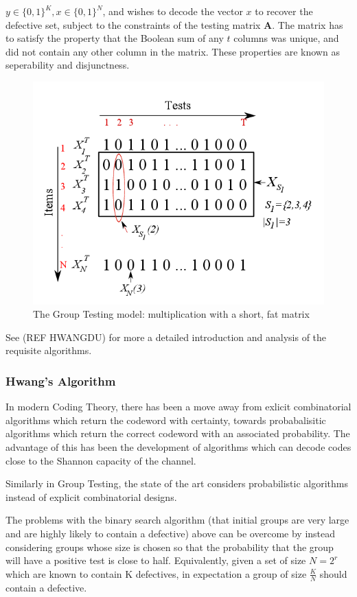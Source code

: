 \(y \in \{0,1\}^K, x \in \{0,1\}^N\), and wishes to decode the vector \(x\) to recover the defective set, subject to the constraints of the testing matrix \(\textbf{A}\). The matrix has to satisfy the property that the Boolean sum of any \(t\) columns was unique, and did not contain any other column in the matrix. These properties are known as seperability and disjunctness. 

\begin{figure}[h]
\centering
\includegraphics[height = 7 cm]{GTFat.png}
\caption{The Group Testing model: multiplication with a short, fat matrix \cite{Atia2008}}
\label{bayesiancs}
\end{figure}

See (REF HWANGDU) for more a detailed introduction and analysis of the requisite algorithms.

\subsubsection*{Hwang's Algorithm}
In modern Coding Theory, there has been a move away from exlicit combinatorial algorithms which return the codeword with certainty, towards probabalisitic algorithms which return the correct codeword with an associated probability. The advantage of this has been the development of algorithms which can decode codes close to the Shannon capacity of the channel.

Similarly in Group Testing, the state of the art considers probabilistic algorithms instead of explicit combinatorial designs. 

The problems with the binary search algorithm (that initial groups are very large and are highly likely to contain a defective) above can be overcome by instead considering groups whose size is chosen so that the probability that the group will have a positive test is close to half. Equivalently, given a set of size \(N=2^r\) which are known to contain K defectives, in expectation a group of size \(\frac{K}{N}\) should contain a defective. 

